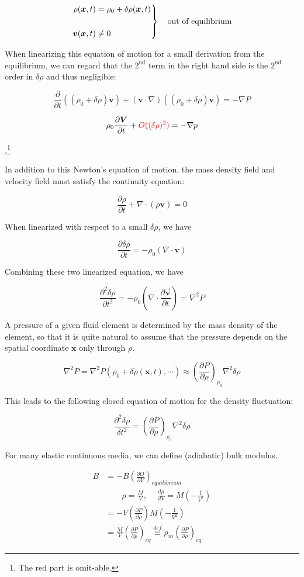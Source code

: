 \[\left.\begin{split}
\rho(\bm{x},t) &= \rho_0 + \delta\rho(\bm{x},t)\\
\ & \ \\
\bm{v}(\bm{x},t) &\neq 0
\end{split}\right\}\text{\quad out of equilibrium} \]

When linearizing this equation of motion for a small derivation from the equilibrium, we can regard that the $2^{\text{nd}}$ term in the right hand side is the $2^{\text{nd}}$ order in $\delta\rho$ and thus negligible:

\[\frac{\partial}{\partial t}\left((\rho_0+\delta\rho)\bm{v}\right) + (\bm{v}\cdot\nabla)\left((\rho_0+\delta\rho)\bm{v}\right) = -\nabla P \]

\[\rho_0\frac{\partial\bm{V}}{\partial t} + {\color{red}{O((\delta\rho)^2)}}= -\nabla p \]

,\footnote{The red part is omit-able. }

In addition to this Newton's equation of motion, the mass density field and velocity field must satisfy the continuity equation:

\[\frac{\partial \rho}{\partial t}+\nabla\cdot(\rho\bm{v}) = 0 \]

When linearized with respect to a small $\delta \rho$, we have

\[\frac{\partial\delta\rho}{\partial t} = -\rho_0(\nabla\cdot\bm{v}) \]

Combining these two linearized equation, we have

\[\frac{\partial^2\delta\rho}{\partial t^2}= -\rho_0(\nabla\cdot\frac{\partial\vec{\bm{v}}}{\partial t}) = \nabla^2 P \]

A pressure of a given fluid element is determined by the mass density of the element, so that it is quite natural to assume that the pressure depends on the spatial coordinate $\bm{x}$ only through $\rho$.

\[\nabla^2 P = \nabla^2 P(\rho_0+\delta\rho(\bm{x},t),\cdots) \approx\left(\frac{\partial P}{\partial\rho}\right)_{\rho_0}\nabla^2\delta\rho \]

This leads to the following closed equation of motion for the density fluctuation:

\[\frac{\partial^2\delta\rho}{\delta t^2} = \left(\frac{\partial P}{\partial \rho}\right)_{\rho_0}\nabla^2\delta\rho \]

For many elastic continuous media, we can define (adiabatic) bulk modulus.

\[\begin{split}
B &= -B\left(\frac{\partial O}{\partial V}\right)_{equilibrium}\\
&\quad\quad \rho = \frac{M}{V},\ \quad \frac{d\rho}{dV} = M\left(-\frac{1}{V^2}\right)\\
&= -V\left(\frac{\partial P}{\partial\rho}\right)M\left(-\frac{1}{V^2}\right)\\ &= \frac{M}{V}\left(\frac{\partial P}{\partial \rho}\right)_{eq} \overset{def}{\equiv}\rho_m\left(\frac{\partial P}{\partial\rho}\right)_{eq}
\end{split} \]

